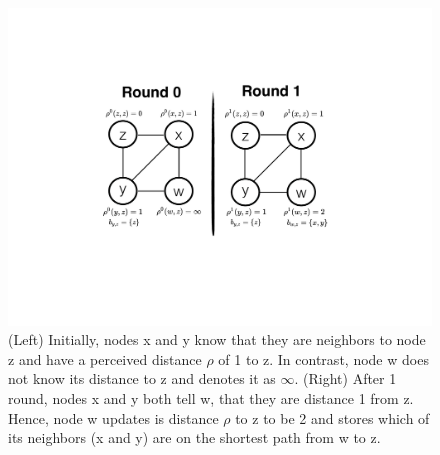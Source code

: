 \documentclass[reprint]{revtex4-1}
\begin{document}
%
\begin{figure}
\centering
\includegraphics[width=\textwidth]{images/BGPSync.pdf}
\caption{(Left) Initially, nodes x and y know that they are neighbors to node z and have a perceived distance $\rho$ of 1 to z.  In contrast, node w does not know its distance to z and denotes it as $\infty$.
(Right) After 1 round, nodes x and y both tell w, that they are distance 1 from z.  Hence, node w updates is distance $\rho$ to z to be 2 and stores which of its neighbors (x and y) are on the shortest path from w to z.}
\label{fig:synchronization}
\end{figure}
%
\end{document}
